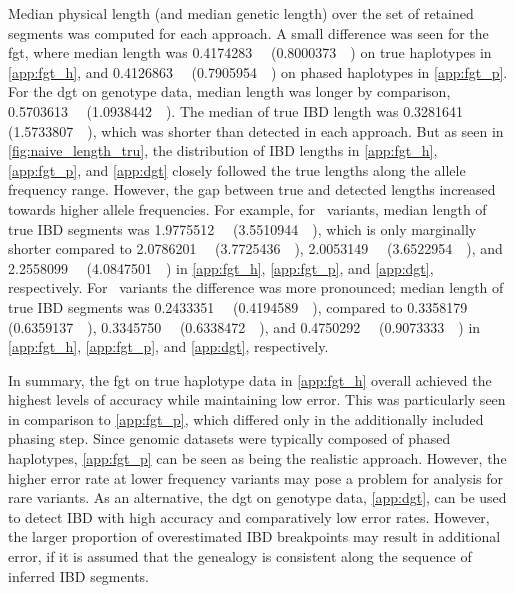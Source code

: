 Median physical length (and median genetic length) over the set of retained segments was computed for each approach.
A small difference was seen for the \gls{fgt}, where median length was
\SI{0.4174283}{\mega\basepair} (\SI{0.8000373}{\centi\morgan})
on true haplotypes in \cref{app:fgt_h}, and
\SI{0.4126863}{\mega\basepair} (\SI{0.7905954}{\centi\morgan})
on phased haplotypes in \cref{app:fgt_p}.
For the \gls{dgt} on genotype data, median length was longer by comparison, \SI{0.5703613}{\mega\basepair} (\SI{1.0938442}{\centi\morgan}).
The median of true IBD length was \SI{0.3281641}{\mega\basepair} (\SI{1.5733807}{\centi\morgan}), which was shorter than detected in each approach.
But as seen in \cref{fig:naive_length_tru}, the distribution of IBD lengths in \ref{app:fgt_h}, \ref{app:fgt_p}, and \ref{app:dgt} closely followed the true lengths along the allele frequency range.
However, the gap between true and detected lengths increased towards higher allele frequencies.
For example, for ~variants, median length of true IBD segments was
\SI{1.9775512}{\mega\basepair} (\SI{3.5510944}{\centi\morgan}),
which is only marginally shorter compared to
\SI{2.0786201}{\mega\basepair} (\SI{3.7725436}{\centi\morgan}),
\SI{2.0053149}{\mega\basepair} (\SI{3.6522954}{\centi\morgan}), and
\SI{2.2558099}{\mega\basepair} (\SI{4.0847501}{\centi\morgan})
in \ref{app:fgt_h}, \ref{app:fgt_p}, and \ref{app:dgt}, respectively.
For ~variants the difference was more pronounced; \ie
median length of true IBD segments was
\SI{0.2433351}{\mega\basepair} (\SI{0.4194589}{\centi\morgan}),
compared to
\SI{0.3358179}{\mega\basepair} (\SI{0.6359137}{\centi\morgan}),
\SI{0.3345750}{\mega\basepair} (\SI{0.6338472}{\centi\morgan}), and
\SI{0.4750292}{\mega\basepair} (\SI{0.9073333}{\centi\morgan})
in \ref{app:fgt_h}, \ref{app:fgt_p}, and \ref{app:dgt}, respectively.


In summary, the \gls{fgt} on true haplotype data in \cref{app:fgt_h} overall achieved the highest levels of accuracy while maintaining low error.
This was particularly seen in comparison to \cref{app:fgt_p}, which differed only in the additionally included phasing step.
Since genomic datasets were typically composed of phased haplotypes, \cref{app:fgt_p} can be seen as being the realistic approach.
However, the higher error rate at lower frequency variants may pose a problem for analysis for rare variants.
As an alternative, the \gls{dgt} on genotype data, \cref{app:dgt}, can be used to detect IBD with high accuracy and comparatively low error rates.
However, the larger proportion of overestimated IBD breakpoints may result in additional error, \eg if it is assumed that the genealogy is consistent along the sequence of inferred IBD segments.
\label{sec:ibd_results_end}



